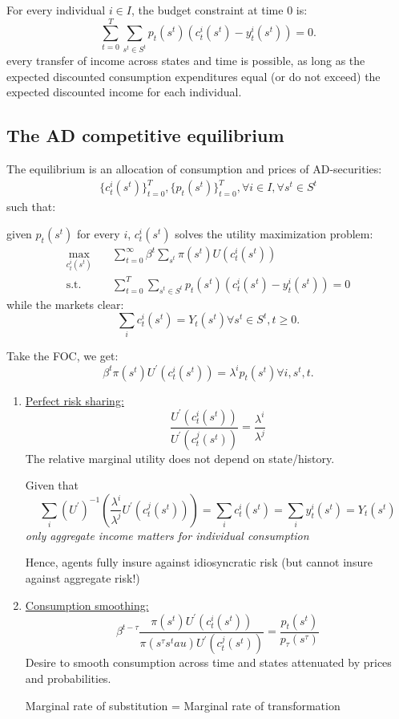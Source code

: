 For every individual $i \in I$, the budget constraint at time 0 is:
\[\sum_{t=0}^{T} \sum_{s^t \in S^t} p_t(s^t) \left( c_t^i(s^t) - y_t^i(s^t) \right) = 0. \]
every transfer of income across states and time is possible, as long
as the expected discounted consumption expenditures equal (or do
not exceed) the expected discounted income for each individual.

\subsection{The AD competitive equilibrium}
The equilibrium is an allocation of consumption and prices of AD-securities:
\begin{align*}
    \{c_t^i(s^t)\}_{t=0}^{T}, \{p_t(s^t)\}_{t=0}^{T}, \forall i \in I, \forall s^t \in S^t
\end{align*}
such that:

given $p_t(s^t)$ for every $i$, $c_t^i(s^t)$ solves the utility maximization problem:
\begin{align*}
    \max_{c_t^i(s^t)} &\quad \sum_{t=0}^{\infty} \beta^t \sum_{s^t} \pi(s^t) U(c_t^i(s^t)) \\
    \text{s.t.} &\quad \sum_{t=0}^{T} \sum_{s^t \in S^t} p_t(s^t) \left( c_t^i(s^t) - y_t^i(s^t) \right) = 0
\end{align*}
while the markets clear:
\[\sum_{i} c_t^i(s^t) = Y_t(s^t) \forall s^t \in S^t, t \geq 0.\]

Take the FOC, we get:
\[\beta^t \pi(s^t) U^{\prime} (c_t^i(s^t)) = \lambda^i p_t(s^t) \forall i, s^t, t.\]

\begin{enumerate}
    \item \underline{Perfect risk sharing:}
    \[ \frac{U^{\prime} (c_t^i(s^t))}{U^{\prime} (c_t^j(s^t))} = \frac{\lambda^i}{\lambda^j} \]
    The relative marginal utility does not depend on state/history.

    Given that
    \[\sum_{i} (U^{\prime} )^{-1} \left( \frac{\lambda^i}{\lambda^j}U^{\prime} (c_t^j(s^t)) \right) = \sum_i c_t^i(s^t) = \sum_i y_t^i(s^t) = Y_t(s^t) \]
    \textit{only aggregate income matters for individual consumption}

    Hence, agents fully insure against idiosyncratic risk (but cannot insure against aggregate risk!)

    \item \underline{Consumption smoothing:}
    \[ \beta ^{t- \tau} \frac{\pi(s^t) U^{\prime} (c_t^i(s^t))}{\pi(s^{\tau} s^tau) U^{\prime} (c_t^j(s^t))} = \frac{p_t(s^t)}{p_{\tau}(s^{\tau})} \]
    Desire to smooth consumption across time and states attenuated by prices and probabilities.
    
    Marginal rate of substitution = Marginal rate of transformation
\end{enumerate}


